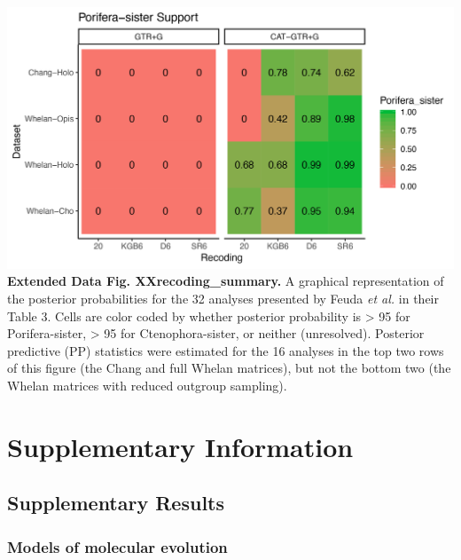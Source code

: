 \documentclass[]{article}
\begin{document}
\includegraphics{figures/Figure_recoding_summary.png} \textbf{Extended
Data Fig. XXrecoding\_summary.} A graphical representation of the
posterior probabilities for the 32 analyses presented by Feuda \emph{et
al.} in their Table 3. Cells are color coded by whether posterior
probability is \textgreater{} 95 for Porifera-sister, \textgreater{} 95
for Ctenophora-sister, or neither (unresolved). Posterior predictive
(PP) statistics were estimated for the 16 analyses in the top two rows
of this figure (the Chang and full Whelan matrices), but not the bottom
two (the Whelan matrices with reduced outgroup sampling).

\pagebreak

\hypertarget{supplementary-information}{%
\section{Supplementary Information}\label{supplementary-information}}

\hypertarget{supplementary-results}{%
\subsection{Supplementary Results}\label{supplementary-results}}

\hypertarget{models-of-molecular-evolution-1}{%
\subsubsection{Models of molecular
evolution}\label{models-of-molecular-evolution-1}}
\end{document}
